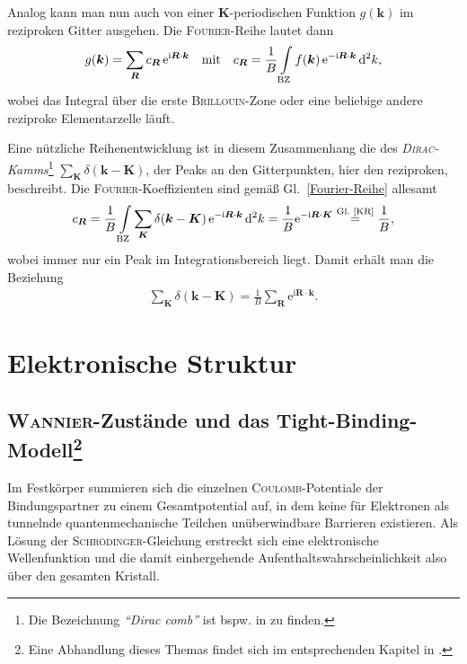 \documentclass[a4paper, 10pt, twoside, openany]{book} %
\def \I {\mathrm i}
\def \E {\mathrm e}
\def \D {\mathrm d}
\def \vec {\boldsymbol}
\begin{document}
Analog kann man nun auch von einer $\vec K$-periodischen Funktion $g(\vec k)$ im reziproken Gitter ausgehen. Die \textsc{Fourier}-Reihe lautet dann
%
\begin{align}
    g(\vec k) = \sum_{\vec R} c_{\vec R} \, \E^{\I \vec R \cdot \vec k} \quad \text{mit} \quad c_{\vec R} = \frac 1 B \int \limits_{\rm BZ} f(\vec k) \, \E^{-\I \vec R \cdot \vec k} \, \D^2 k,
    \label{Fourier-Reihe}
\end{align}
%
wobei das Integral über die erste \textsc{Brillouin}-Zone oder eine beliebige andere reziproke Elementarzelle läuft.

Eine nützliche Reihenentwicklung ist in diesem Zusammenhang die des \emph{\textsc{Dirac}-Kamms}\footnote{Die Bezeichnung \emph{"`Dirac comb"'} ist bspw. in \cite[S.~191]{Cordoba} zu finden.} $\sum_{\vec K} \delta(\vec k - \vec K)$, der Peaks an den Gitterpunkten, hier den reziproken, beschreibt. Die \textsc{Fourier}-Koeffizienten sind gemäß Gl.~\ref{Fourier-Reihe} allesamt
%
\begin{align*}
    c_{\vec R} = \frac 1 B \int \limits_{\rm BZ} \sum_{\vec K} \delta(\vec k - \vec K) \, \E^{-\I \vec R \cdot \vec k} \, \D^2 k = \frac 1 B \E^{-\I \vec R \cdot \vec K} \overset{\text{Gl.~\ref{KR}}} = \frac 1 B,
\end{align*}
%
wobei immer nur ein Peak im Integrationsbereich liegt. Damit erhält man die Beziehung
\begin{align}
    \sum_{\vec K} \delta(\vec k - \vec K) = \frac 1 B \sum_{\vec R} \E^{\I \vec R \cdot \vec k}.
    \label{Dirac-Kamm}
\end{align}

\section{Elektronische Struktur}

\subsection[\textsc{Wannier}-Zustände und das Tight-Binding-Modell]{\textsc{Wannier}-Zustände und das Tight-Binding-Modell\footnote{Eine Abhandlung dieses Themas findet sich im entsprechenden Kapitel in \cite[S.~109ff]{Czycholl}.}}
\label{Wannier-Zustaende}

Im Festkörper summieren sich die einzelnen \textsc{Coulomb}-Potentiale der Bindungspartner zu einem Gesamtpotential auf, in dem keine für Elektronen als tunnelnde quantenmechanische Teilchen unüberwindbare Barrieren existieren. Als Lösung der \textsc{Schrödinger}-Gleichung erstreckt sich eine elektronische Wellenfunktion und die damit einhergehende Aufenthaltswahrscheinlichkeit also über den gesamten Kristall.
\end{document}

